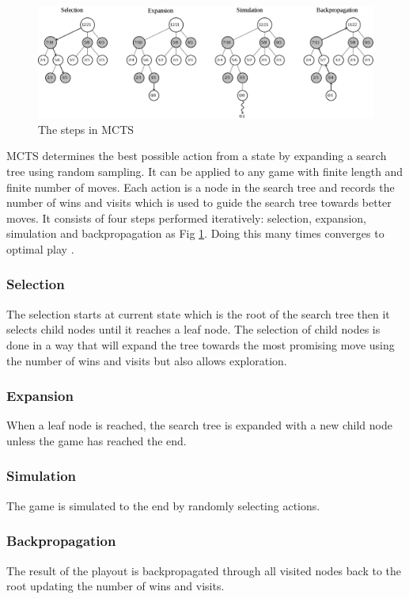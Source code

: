 \documentclass{kththesis}
\begin{document}
\begin{figure}
\includegraphics[width=\textwidth]{images/mcst.png}
\caption{The steps in MCTS}
\label{fig:mcts-steps}
\end{figure}

MCTS determines the best possible action from a state by expanding a search tree using random sampling. It can be applied to any game with finite length and finite number of moves. Each action is a node in the search tree and records the number of wins and visits which is used to guide the search tree towards better moves. It consists of four steps performed iteratively: selection, expansion, simulation and backpropagation as Fig \ref{fig:mcts-steps}. Doing this many times converges to optimal play \cite{kocsis2006bandit}.

\subsubsection{Selection}
The selection starts at current state which is the root of the search tree then it selects child nodes until it reaches a leaf node. The selection of child nodes is done in a way that will expand the tree towards the most promising move using the number of wins and visits but also allows exploration.

\subsubsection{Expansion}
When a leaf node is reached, the search tree is expanded with a new child node unless the game has reached the end.

\subsubsection{Simulation}
The game is simulated to the end by randomly selecting actions.

\subsubsection{Backpropagation}
The result of the playout is backpropagated through all visited nodes back to the root updating the number of wins and visits.
\end{document}
